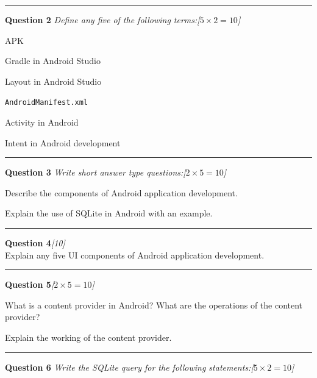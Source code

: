 \documentclass[11pt,a4paper]{article}
\newcommand{\pts}[1]{\hfill   \textit{[#1]}}
\begin{document}
\medskip\rule{\linewidth}{0.2pt}\medskip




\noindent   \textbf{Question 2}   \textit{Define any five of the following terms:}\pts{$5  \times 2 = 10$}

\begin{parts}
  \item APK
  \item Gradle in Android Studio
  \item Layout in Android Studio
  \item   \texttt{AndroidManifest.xml}
  \item Activity in Android
  \item Intent in Android development
\end{parts}

\medskip\rule{\linewidth}{0.2pt}\medskip




\noindent   \textbf{Question 3}   \textit{Write short answer type questions:}\pts{$2  \times 5 = 10$}

\begin{parts}
  \item Describe the components of Android application development.
  \item Explain the use of SQLite in Android with an example.
\end{parts}

\medskip\rule{\linewidth}{0.2pt}\medskip




\noindent   \textbf{Question 4}\pts{10} \\
Explain any five UI components of Android application development.

\medskip\rule{\linewidth}{0.2pt}\medskip




\noindent   \textbf{Question 5}\pts{$2  \times 5 = 10$}

\begin{parts}
  \item What is a content provider in Android? What are the operations of the content provider?
  \item Explain the working of the content provider.
\end{parts}

\medskip\rule{\linewidth}{0.2pt}\medskip




\noindent   \textbf{Question 6}   \textit{Write the SQLite query for the following statements:}\pts{$5  \times 2 = 10$}
\end{document}
